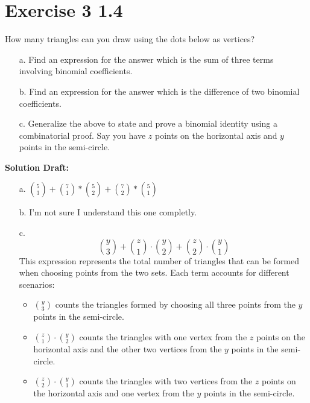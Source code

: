 \documentclass{article}
\begin{document}
\section*{Exercise 3 1.4}  

How many triangles can you draw using the dots below as vertices?
\begin{enumerate}
    \item[a.] Find an expression for the answer which is the sum of three terms involving binomial coefficients.
    \item[b.] Find an expression for the answer which is the difference of two binomial coefficients.
    \item[c.] Generalize the above to state and prove a binomial identity using a combinatorial proof. Say you have \( z \) points on the horizontal axis and \( y \) points in the semi-circle.
\end{enumerate}


\vspace{0.5cm}
\noindent\textbf{Solution Draft:} 
\vspace{0.2cm}

\begin{enumerate}
    \item[a.] $\binom{5}{3}+\binom{7}{1}*\binom{5}{2}+\binom{7}{2}*\binom{5}{1}$
    \item[b.] I'm not sure I understand this one completly.
    \item[c.] 
    \[
        \binom{y}{3} + \binom{z}{1} \cdot \binom{y}{2} + \binom{z}{2} \cdot \binom{y}{1}
    \]
    This expression represents the total number of triangles that can be formed when choosing points from the two sets. Each term accounts for different scenarios:
\begin{itemize}
    \item \( \binom{y}{3} \) counts the triangles formed by choosing all three points from the \( y \) points in the semi-circle.
    \item \( \binom{z}{1} \cdot \binom{y}{2} \) counts the triangles with one vertex from the \( z \) points on the horizontal axis and the other two vertices from the \( y \) points in the semi-circle.
    \item \( \binom{z}{2} \cdot \binom{y}{1} \) counts the triangles with two vertices from the \( z \) points on the horizontal axis and one vertex from the \( y \) points in the semi-circle.
\end{itemize}

\end{enumerate}
\end{document}
